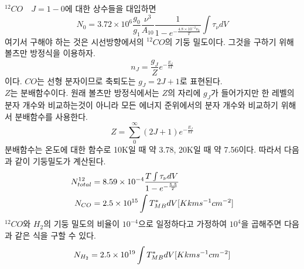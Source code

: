 $^{12}CO\quad J=1-0$에 대한 상수들을 대입하면
\begin{equation}
N_0 = 3.72 \times 10^6 \frac{g_0}{g_1} \frac{\nu^3}{A_{10}}\frac{1}{1-e^{-\frac{4.8 \times 10^{-2}\nu_0}{T}}} \int \tau_\nu dV
\end{equation}
여기서 구해야 하는 것은 시선방향에서의 $^{12}CO$의 기둥 밀도이다. 그것을 구하기 위해 볼츠만 방정식을 이용하자. 
\begin{equation*}
	n_J = \frac{g_J}{Z} e^{-\frac{E_J}{kT}}
\end{equation*}
이다. $CO$는 선형 분자이므로 축퇴도는 $g_J = 2J+1$로 표현된다. \\
$Z$는 분배함수이다. 원래 볼츠만 방정식에서는 $Z$의 자리에 $g_J$가 들어가지만 한 레벨의 분자 개수와 비교하는것이 아니라 모든 에너지 준위에서의 분자 개수와 비교하기 위해서 분배함수를 사용한다.
\begin{equation}
Z = \sum_{0}^{\infty} (2J+1) e^{-\frac{E_J}{kT}}
\end{equation}
분배함수는 온도에 대한 함수로 10K일 때 약 3.78, 20K일 때 약 7.56이다. 따라서 다음과 같이 기둥밀도가 계산된다.
\begin{align}
	N^{12}_{total} &= 8.59 \times 10^{-4} \frac{T \int \tau_\nu dV}{1-e^{-\frac{5.5}{T}}}\\
	N_{CO} &= 2.5\times 10^{15}\int{T_{MB}^*dV}  [K km \vspace{2mm} s^{-1}cm^{-2}] \label{column density}
\end{align}
$^{12}CO$와 $H_2$의 기둥 밀도의 비율이 $10^{-4}$으로 일정하다고 가정하여 $10^4$을 곱해주면 다음과 같은 식을 구할 수 있다.
\begin{equation}
N_{H_2}=2.5\times 10^{19}\int{T_{MB}^*dV}  [K km \vspace{2mm}s^{-1}cm^{-2}]\\
\end{equation}
